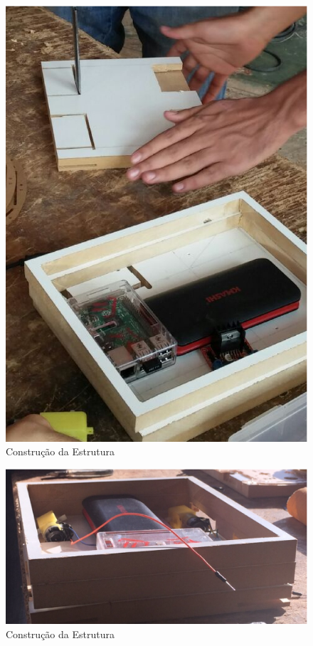 \begin{apendicesenv}
\begin{figure}[H]
    \centering
    \includegraphics[width=1\textwidth]{figuras/montagem_5.eps}
    \caption{Construção da Estrutura}
    \label{fig:montagem_5}
\end{figure}

\begin{figure}[H]
    \centering
    \includegraphics[width=1\textwidth]{figuras/montagem_6.eps}
    \caption{Construção da Estrutura}
    \label{fig:montagem_6}
\end{figure}


\end{apendicesenv}
